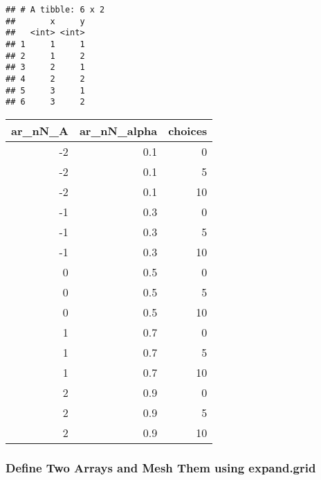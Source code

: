 \documentclass[
]{book}
\newenvironment{Shaded}{\begin{snugshade}}{\end{snugshade}}
\newcommand{\CommentTok}[1]{\textcolor[rgb]{0.56,0.35,0.01}{\textit{#1}}}
\newcommand{\DataTypeTok}[1]{\textcolor[rgb]{0.13,0.29,0.53}{#1}}
\newcommand{\KeywordTok}[1]{\textcolor[rgb]{0.13,0.29,0.53}{\textbf{#1}}}
\newcommand{\NormalTok}[1]{#1}
\newcommand{\OperatorTok}[1]{\textcolor[rgb]{0.81,0.36,0.00}{\textbf{#1}}}
\newcommand{\StringTok}[1]{\textcolor[rgb]{0.31,0.60,0.02}{#1}}
\begin{document}
\begin{verbatim}
## # A tibble: 6 x 2
##       x     y
##   <int> <int>
## 1     1     1
## 2     1     2
## 3     2     1
## 4     2     2
## 5     3     1
## 6     3     2
\end{verbatim}

\begin{Shaded}
\end{Shaded}

\begin{table}[!h]
\centering
\begin{tabular}{r|r|r}
\hline
ar\_nN\_A & ar\_nN\_alpha & choices\\
\hline
\rowcolor{gray!6}  -2 & 0.1 & 0\\
\hline
-2 & 0.1 & 5\\
\hline
\rowcolor{gray!6}  -2 & 0.1 & 10\\
\hline
-1 & 0.3 & 0\\
\hline
\rowcolor{gray!6}  -1 & 0.3 & 5\\
\hline
-1 & 0.3 & 10\\
\hline
\rowcolor{gray!6}  0 & 0.5 & 0\\
\hline
0 & 0.5 & 5\\
\hline
\rowcolor{gray!6}  0 & 0.5 & 10\\
\hline
1 & 0.7 & 0\\
\hline
\rowcolor{gray!6}  1 & 0.7 & 5\\
\hline
1 & 0.7 & 10\\
\hline
\rowcolor{gray!6}  2 & 0.9 & 0\\
\hline
2 & 0.9 & 5\\
\hline
\rowcolor{gray!6}  2 & 0.9 & 10\\
\hline
\end{tabular}
\end{table}

\hypertarget{define-two-arrays-and-mesh-them-using-expand.grid}{%
\subsubsection{Define Two Arrays and Mesh Them using expand.grid}\label{define-two-arrays-and-mesh-them-using-expand.grid}}
\end{document}
